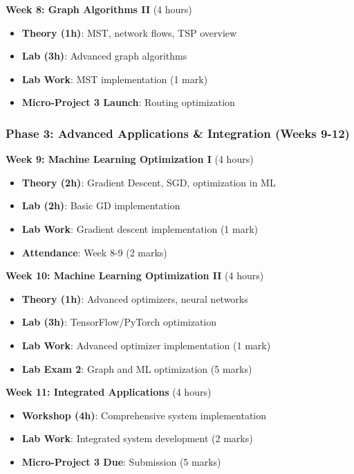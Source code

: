 \documentclass[
  letterpaper,
  DIV=11,
  numbers=noendperiod]{scrreprt}
\providecommand{\tightlist}{%
  \setlength{\itemsep}{0pt}\setlength{\parskip}{0pt}}
\begin{document}
\textbf{Week 8: Graph Algorithms II} (4 hours)

\begin{itemize}
\tightlist
\item
  \textbf{Theory (1h)}: MST, network flows, TSP overview
\item
  \textbf{Lab (3h)}: Advanced graph algorithms
\item
  \textbf{Lab Work}: MST implementation (1 mark)
\item
  \textbf{Micro-Project 3 Launch}: Routing optimization
\end{itemize}

\subsubsection*{Phase 3: Advanced Applications \& Integration (Weeks
9-12)}\label{phase-3-advanced-applications-integration-weeks-9-12}

\textbf{Week 9: Machine Learning Optimization I} (4 hours)

\begin{itemize}
\tightlist
\item
  \textbf{Theory (2h)}: Gradient Descent, SGD, optimization in ML
\item
  \textbf{Lab (2h)}: Basic GD implementation
\item
  \textbf{Lab Work}: Gradient descent implementation (1 mark)
\item
  \textbf{Attendance}: Week 8-9 (2 marks)
\end{itemize}

\textbf{Week 10: Machine Learning Optimization II} (4 hours)

\begin{itemize}
\tightlist
\item
  \textbf{Theory (1h)}: Advanced optimizers, neural networks
\item
  \textbf{Lab (3h)}: TensorFlow/PyTorch optimization
\item
  \textbf{Lab Work}: Advanced optimizer implementation (1 mark)
\item
  \textbf{Lab Exam 2}: Graph and ML optimization (5 marks)
\end{itemize}

\textbf{Week 11: Integrated Applications} (4 hours)

\begin{itemize}
\tightlist
\item
  \textbf{Workshop (4h)}: Comprehensive system implementation
\item
  \textbf{Lab Work}: Integrated system development (2 marks)
\item
  \textbf{Micro-Project 3 Due}: Submission (5 marks)
\end{itemize}
\end{document}
